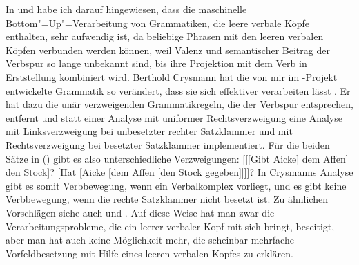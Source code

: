 In  und  habe ich darauf hingewiesen,
dass die maschinelle Bottom"=Up"=Verarbeitung von Grammatiken, die leere verbale Köpfe enthalten, sehr aufwendig
ist, da beliebige Phrasen mit den leeren verbalen Köpfen verbunden werden können, weil
Valenz und semantischer Beitrag der Verbspur so lange unbekannt sind, bis ihre Projektion
mit dem Verb in Erststellung kombiniert wird. 
%
Berthold Crysmann hat die von mir im \verbmobil-Projekt
entwickelte Grammatik \citep{MK2000a} so verändert, dass sie sich effektiver verarbeiten lässt \citep{Crysmann2003b}.
Er hat dazu die unär verzweigenden Grammatikregeln, die der Verbspur entsprechen, entfernt und statt einer
Analyse mit uniformer Rechtsverzweigung eine Analyse mit Linksverzweigung bei unbesetzter
rechter Satzklammer und mit Rechtsverzweigung bei besetzter Satzklammer implementiert.
Für die beiden Sätze in () gibt es also unterschiedliche Verzweigungen:
\eal
\ex {}[[[Gibt Aicke] dem Affen] den Stock]?
\ex {}[Hat [Aicke [dem Affen [den Stock gegeben]]]]?
\zl
In Crysmanns Analyse gibt es somit Verbbewegung, wenn ein Verbalkomplex vorliegt, und es
gibt keine Verbbewegung, wenn die rechte Satzklammer nicht besetzt ist.
Zu ähnlichen Vorschlägen siehe auch  und .
Auf diese Weise hat man zwar die Verarbeitungsprobleme, die ein leerer verbaler Kopf mit sich
bringt, beseitigt, aber man hat auch keine Möglichkeit mehr, die scheinbar mehrfache
Vorfeldbesetzung mit Hilfe eines leeren verbalen Kopfes zu erklären.

